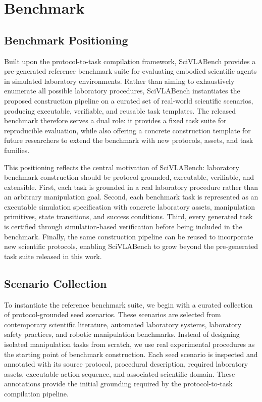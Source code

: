 \section{Benchmark}
\label{sec:benchmark}

\subsection{Benchmark Positioning}
\label{sec:benchmark-positioning}

Built upon the protocol-to-task compilation framework, SciVLABench provides a pre-generated reference benchmark suite for evaluating embodied scientific agents in simulated laboratory environments. Rather than aiming to exhaustively enumerate all possible laboratory procedures, SciVLABench instantiates the proposed construction pipeline on a curated set of real-world scientific scenarios, producing executable, verifiable, and reusable task templates. The released benchmark therefore serves a dual role: it provides a fixed task suite for reproducible evaluation, while also offering a concrete construction template for future researchers to extend the benchmark with new protocols, assets, and task families.

This positioning reflects the central motivation of SciVLABench: laboratory benchmark construction should be protocol-grounded, executable, verifiable, and extensible. First, each task is grounded in a real laboratory procedure rather than an arbitrary manipulation goal. Second, each benchmark task is represented as an executable simulation specification with concrete laboratory assets, manipulation primitives, state transitions, and success conditions. Third, every generated task is certified through simulation-based verification before being included in the benchmark. Finally, the same construction pipeline can be reused to incorporate new scientific protocols, enabling SciVLABench to grow beyond the pre-generated task suite released in this work.

\subsection{Scenario Collection}
\label{sec:scenario-collection}

To instantiate the reference benchmark suite, we begin with a curated collection of protocol-grounded seed scenarios. These scenarios are selected from contemporary scientific literature, automated laboratory systems, laboratory safety practices, and robotic manipulation benchmarks. Instead of designing isolated manipulation tasks from scratch, we use real experimental procedures as the starting point of benchmark construction. Each seed scenario is inspected and annotated with its source protocol, procedural description, required laboratory assets, executable action sequence, and associated scientific domain. These annotations provide the initial grounding required by the protocol-to-task compilation pipeline.

